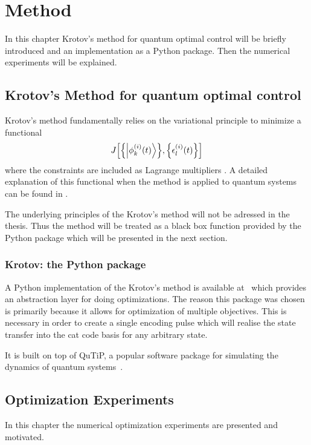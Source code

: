 \documentclass[main.tex]{subfiles}
\begin{document}
\chapter{Method}
In this chapter Krotov's method for quantum optimal control will be briefly introduced and an implementation as a Python package.
Then the numerical experiments will be explained.

\section{Krotov's Method for quantum optimal control}
Krotov's method fundamentally relies on the variational principle to minimize a functional \[ J\qty[\qty{\ket{\phi^{(i)}_k(t)}},\qty{\epsilon_l^{(i)}(t)}] \] where the constraints are included as Lagrange multipliers \cite{goerz_krotov:_2019}.
A detailed explanation of this functional when the method is applied to quantum systems can be found in \cite{reich_monotonically_2012}.

The underlying principles of the Krotov's method will not be adressed in the thesis.
Thus the method will be treated as a black box function provided by the Python package which will be presented in the next section.

\subsection{Krotov: the Python package}
A Python implementation of the Krotov's method is available at~\cite{goerz_krotov:_2019} which provides an abstraction layer for doing optimizations.
The reason this package was chosen is primarily because it allows for optimization of multiple objectives.
This is necessary in order to create a single encoding pulse which will realise the state transfer into the cat code basis for any arbitrary state.

It is built on top of QuTiP, a popular software package for simulating the dynamics of quantum systems~\cite{johansson_qutip_2013}.

\section{Optimization Experiments}
In this chapter the numerical optimization experiments are presented and motivated.
\end{document}
